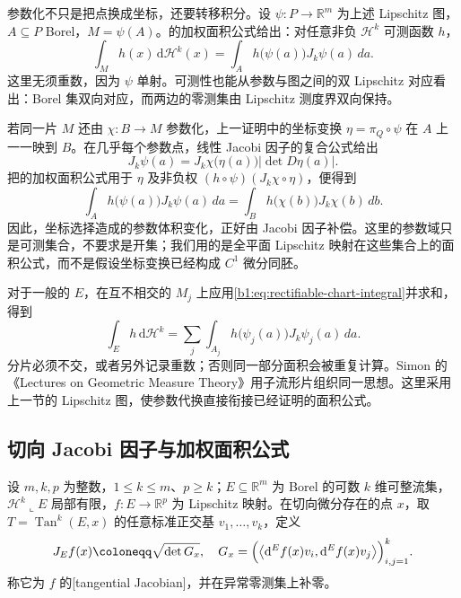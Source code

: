 参数化不只是把点换成坐标，还要转移积分。设 \(\psi:P\rightarrow\mathbb R^m\) 为上述 Lipschitz 图，\(A\subseteq P\) Borel，\(M=\psi(A)\)。的加权面积公式给出：对任意非负 \(\mathcal H^k\) 可测函数 \(h\)，
\begin{equation}
\label{b1:eq:rectifiable-chart-integral}
 \int_Mh(x)\,\mathrm{d}\mathcal H^k(x)
 =\int_A h\bigl(\psi(a)\bigr)J_k\psi(a)\,da.
\end{equation}
这里无须重数，因为 \(\psi\) 单射。可测性也能从参数与图之间的双 Lipschitz 对应看出：Borel 集双向对应，而两边的零测集由 Lipschitz 测度界双向保持。

\ProseParagraphBreak

若同一片 \(M\) 还由 \(\chi:B\rightarrow M\) 参数化，上一证明中的坐标变换 \(\eta=\pi_Q\circ\psi\) 在 \(A\) 上一一映到 \(B\)。在几乎每个参数点，线性 Jacobi 因子的复合公式给出
\begin{equation}
\label{b1:eq:rectifiable-chart-transition}
 J_k\psi(a)=J_k\chi\bigl(\eta(a)\bigr)|\det D\eta(a)|.
\end{equation}
把的加权面积公式用于 \(\eta\) 及非负权 \((h\circ\psi)(J_k\chi\circ\eta)\)，便得到
\[
 \int_A h\bigl(\psi(a)\bigr)J_k\psi(a)\,da
 =\int_B h\bigl(\chi(b)\bigr)J_k\chi(b)\,db.
\]
因此，坐标选择造成的参数体积变化，正好由 Jacobi 因子补偿。这里的参数域只是可测集合，不要求是开集；我们用的是全平面 Lipschitz 映射在这些集合上的面积公式，而不是假设坐标变换已经构成 \(C^1\) 微分同胚。

\ProseParagraphBreak

对于一般的 \(E\)，在互不相交的 \(M_j\) 上应用\eqref{b1:eq:rectifiable-chart-integral}并求和，得到
\[
 \int_Eh\,\mathrm{d}\mathcal H^k
 =\sum_j\int_{A_j}h\bigl(\psi_j(a)\bigr)J_k\psi_j(a)\,da.
\]
分片必须不交，或者另外记录重数；否则同一部分面积会被重复计算。Simon 的《Lectures on Geometric Measure Theory》\cite[\S12, 12.1 DEFINITION, 12.2 REMARK, and 12.3--12.5]{Simon1983Lectures}用子流形片组织同一思想。这里采用上一节的 Lipschitz 图，使参数代换直接衔接已经证明的面积公式。

\subsection{切向 Jacobi 因子与加权面积公式}
\label{b1:subsec:190303}

\begin{definition}
\label{b1:def:tangential-jacobian}
设 \(m,k,p\) 为整数，\(1\leq k\leq m\)、\(p\geq k\)；\(E\subseteq\mathbb R^m\) 为 Borel 的可数 \(k\) 维可整流集，\(\mathcal H^k\llcorner E\) 局部有限，\(f:E\to\mathbb R^p\) 为 Lipschitz 映射。在切向微分存在的点 \(x\)，取 \(T=\operatorname{Tan}^k(E,x)\) 的任意标准正交基 \(v_1,\ldots,v_k\)，定义
\[
 J_Ef(x)\coloneqq\sqrt{\det G_x},\quad
 G_x=\Bigl(\bigl\langle \mathrm{d}^Ef(x)v_i,\mathrm{d}^Ef(x)v_j\bigr\rangle\Bigr)_{i,j=1}^k.
\]
称它为 \(f\) 的[tangential Jacobian]，并在异常零测集上补零。
\end{definition}

